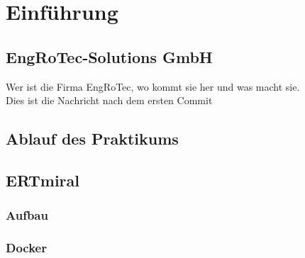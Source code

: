 \chapter{Einführung}
\label{chp:Einführung}
 
\section{EngRoTec-Solutions GmbH}
Wer ist die Firma EngRoTec, wo kommt sie her und was macht sie. \\

Dies ist die Nachricht nach dem ersten Commit

\section{Ablauf des Praktikums}

\newpage
\section{ERTmiral}
\subsection{Aufbau}
\subsection{Docker}